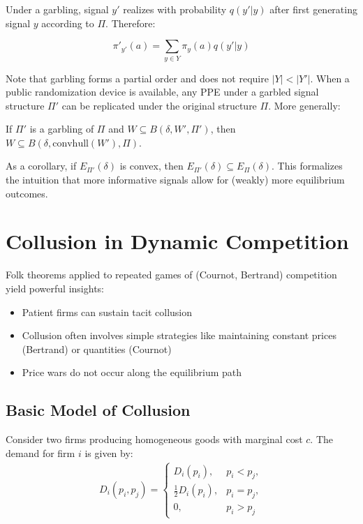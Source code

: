 \documentclass[11pt]{elegantbook_2}
\begin{document}
Under a garbling, signal $y'$ realizes with probability $q(y'|y)$ after first generating signal $y$ according to $\Pi$. Therefore:

\begin{equation}
    \pi'_{y'}(a)=\sum_{y\in Y}\pi_y(a)q(y'|y)
\end{equation}

Note that garbling forms a partial order and does not require $|Y|<|Y'|$. When a public randomization device is available, any PPE under a garbled signal structure $\Pi'$ can be replicated under the original structure $\Pi$. More generally:

\begin{proposition}
If $\Pi'$ is a garbling of $\Pi$ and $W \subseteq B(\delta, W', \Pi')$, then $W \subseteq B(\delta, \text{convhull}(W'), \Pi)$.
\end{proposition}

As a corollary, if $E_{\Pi'}(\delta)$ is convex, then $E_{\Pi'}(\delta) \subseteq E_{\Pi}(\delta)$. This formalizes the intuition that more informative signals allow for (weakly) more equilibrium outcomes.





\section{Collusion in Dynamic Competition}
Folk theorems applied to repeated games of (Cournot, Bertrand) competition yield powerful insights:
\begin{itemize}
    \item Patient firms can sustain tacit collusion
    \item Collusion often involves simple strategies like maintaining constant prices (Bertrand) or quantities (Cournot)
    \item Price wars do not occur along the equilibrium path
\end{itemize}

\subsection{Basic Model of Collusion}
Consider two firms producing homogeneous goods with marginal cost $c$. The demand for firm $i$ is given by:
\begin{equation}
    \begin{aligned}
        D_i(p_i,p_j)=\left\{\begin{matrix}
            D_i(p_i),& p_i<p_j,\\
            \frac{1}{2}D_i(p_i),& p_i=p_j,\\
            0,& p_i>p_j
        \end{matrix}\right.
    \end{aligned}
    \nonumber
\end{equation}
\end{document}
